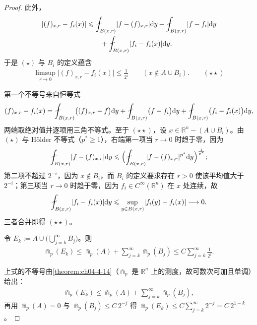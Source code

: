 \documentclass[../../main.tex]{subfiles}%
\begin{document}
\begin{proof}
此外，
\begin{align*}
\lvert(f)_{x,r}-f_i(x)\rvert
&\leqslant\fint_{B(x,r)}\lvert f-(f)_{x,r}\rvert\diff y+\fint_{B(x,r)}\lvert f-f_i\rvert\diff y\\
&\qquad+\fint_{B(x,r)}\lvert f_i-f_i(x)\rvert\diff y .
\end{align*}
于是 $(\star)$ 与 $B_i$ 的定义蕴含
\begin{align*}
\limsup_{r\to0}\lvert(f)_{x,r}-f_i(x)\rvert\leqslant\frac{1}{2^i}\qquad(x\notin A\cup B_i).\qquad(\star\star)
\end{align*}

第一个不等号来自恒等式
\begin{align*}
(f)_{x,r}-f_i(x)=\fint_{B(x,r)}\bigl((f)_{x,r}-f\bigr)\diff y+\fint_{B(x,r)}\bigl(f-f_i\bigr)\diff y+\fint_{B(x,r)}\bigl(f_i-f_i(x)\bigr)\diff y ,
\end{align*}
两端取绝对值并逐项用三角不等式。至于 $(\star\star)$，设 $x\in\mathbb{R}^n-(A\cup B_i)$。由 $(\star)$ 与 Hölder 不等式（$p^*\geqslant1$），右端第一项当 $r\to0$ 时趋于零，因为
\begin{align*}
\fint_{B(x,r)}\lvert f-(f)_{x,r}\rvert\diff y\leqslant\Bigl(\fint_{B(x,r)}\lvert f-(f)_{x,r}\rvert^{p^*}\diff y\Bigr)^{\frac{1}{p^*}} ;
\end{align*}
第二项不超过 $2^{-i}$，因为 $x\notin B_i$，而 $B_i$ 的定义要求存在 $r>0$ 使该平均值大于 $2^{-i}$；第三项当 $r\to0$ 时趋于零，因为 $f_i\in C^\infty(\mathbb{R}^n)$ 在 $x$ 处连续，故
\begin{align*}
\fint_{B(x,r)}\lvert f_i-f_i(x)\rvert\diff y\leqslant\sup_{y\in B(x,r)}\lvert f_i(y)-f_i(x)\rvert\longrightarrow0 .
\end{align*}
三者合并即得 $(\star\star)$。

令 $E_k:=A\cup\bigl(\bigcup_{j=k}^{\infty}B_j\bigr)$。则
\begin{align*}
\Cap_p(E_k)\leqslant\Cap_p(A)+\sum_{j=k}^{\infty}\Cap_p(B_j)\leqslant C\sum_{j=k}^{\infty}\frac{1}{2^j} .
\end{align*}

上式的不等号由\cref{theorem:ch04-4-14}（$\Cap_p$ 是 $\mathbb{R}^n$ 上的测度，故可数次可加且单调）给出： %
\begin{align*}
\Cap_p(E_k)\leqslant\Cap_p(A)+\sum_{j=k}^{\infty}\Cap_p(B_j) ,
\end{align*}
再用 $\Cap_p(A)=0$ 与 $\Cap_p(B_j)\leqslant C\,2^{-j}$ 得 $\Cap_p(E_k)\leqslant C\sum_{j=k}^{\infty}2^{-j}=C\,2^{1-k}$。%


\end{proof}
\end{document}
